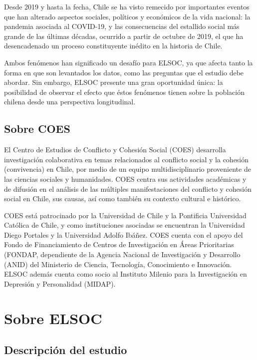\documentclass[
  12pt,
]{book}
\begin{document}
Desde 2019 y hasta la fecha, Chile se ha visto remecido por importantes eventos que han alterado aspectos sociales, políticos y económicos de la vida nacional: la pandemia asociada al COVID-19, y las consecuencias del estallido social más grande de las últimas décadas, ocurrido a partir de octubre de 2019, el que ha desencadenado un proceso constituyente inédito en la historia de Chile.

Ambos fenómenos han significado un desafío para ELSOC, ya que afecta tanto la forma en que son levantados los datos, como las preguntas que el estudio debe abordar. Sin embargo, ELSOC presente una gran oportunidad única: la posibilidad de observar el efecto que éstos fenómenos tienen sobre la población chilena desde una perspectiva longitudinal.

\hypertarget{sobre-coes}{%
\section{Sobre COES}\label{sobre-coes}}

El Centro de Estudios de Conflicto y Cohesión Social (COES) desarrolla investigación colaborativa en temas relacionados al conflicto social y la cohesión (convivencia) en Chile, por medio de un equipo multidisciplinario proveniente de las ciencias sociales y humanidades. COES centra sus actividades académicas y de difusión en el análisis de las múltiples manifestaciones del conflicto y cohesión social en Chile, sus causas, así como también su contexto cultural e histórico.

COES está patrocinado por la Universidad de Chile y la Pontificia Universidad Católica de Chile, y como instituciones asociadas se encuentran la Universidad Diego Portales y la Universidad Adolfo Ibáñez. COES cuenta con el apoyo del Fondo de Financiamiento de Centros de Investigación en Áreas Prioritarias (FONDAP, dependiente de la Agencia Nacional de Investigación y Desarrollo (ANID) del Ministerio de Ciencia, Tecnología, Conocimiento e Innovación. ELSOC además cuenta como socio al Instituto Milenio para la Investigación en Depresión y Personalidad (MIDAP).

\hypertarget{sobre-elsoc}{%
\chapter{Sobre ELSOC}\label{sobre-elsoc}}

\hypertarget{descripciuxf3n-del-estudio}{%
\section{Descripción del estudio}\label{descripciuxf3n-del-estudio}}
\end{document}
